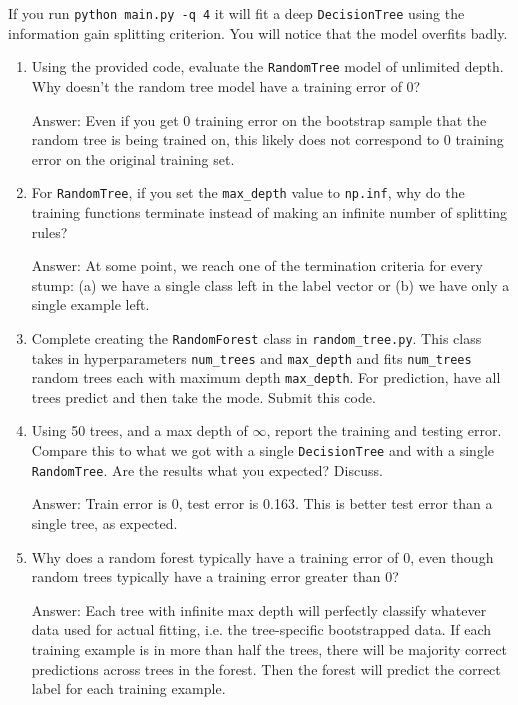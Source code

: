 \documentclass{article}
\def\ans#1{\par\gre{Answer: #1}}
\def\blu#1{{\color{blu}#1}}
\def\gre#1{{\color{gre}#1}}
\def\enum#1{\begin{enumerate}#1\end{enumerate}}
\begin{document}
	If you run \texttt{python main.py -q 4} it will fit a deep \texttt{DecisionTree}
	using the information gain splitting criterion. You will notice that the model overfits badly.
	
	
	
	
	\blu{
		\enum{
			\item Using the provided code, evaluate the \texttt{RandomTree} model of unlimited depth. Why doesn't the random tree model have a training error of 0?
			\ans{
				Even if you get 0 training error on the bootstrap sample that the random tree is being trained on, this likely does not correspond to 0 training error on the original training set.}
			\item For \texttt{RandomTree}, if you set the \texttt{max\_depth} value to \texttt{np.inf}, why do the training functions terminate instead of making an infinite number of splitting rules?
			\ans{
				At some point, we reach one of the termination criteria for every stump: (a) we have a single class left in the label vector or (b) we have only a single example left.
			}
			\item Complete creating the \texttt{RandomForest} class in \texttt{random\string_tree.py}. This class takes in hyperparameters \texttt{num\string_trees} and \texttt{max\string_depth} and
			fits \texttt{num\string_trees} random trees each with maximum depth \texttt{max\string_depth}. For prediction, have all trees predict and then take the mode. Submit this code.
			\item Using 50 trees, and a max depth of $\infty$, report the training and testing error. Compare this to what we got with a single \texttt{DecisionTree} and with a single \texttt{RandomTree}. Are the results what you expected? Discuss.
			\ans{Train error is 0, test error is 0.163. This is better test error than a single tree, as expected.}
			\item Why does a random forest typically have a training error of 0, even though random trees typically have a training error greater than 0?
			\ans{Each tree with infinite max depth will perfectly classify whatever data used for actual fitting, i.e. the tree-specific bootstrapped data. If each training example is in more than half the trees, there will be majority correct predictions across trees in the forest. Then the forest will predict the correct label for each training example.}
		}
	}
	
\end{document}
